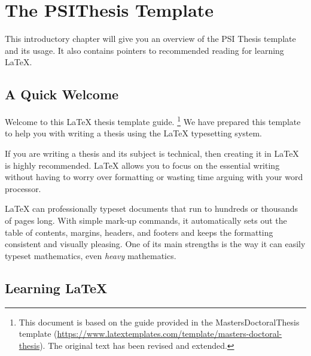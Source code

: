 
\chapter{The PSIThesis Template} %

\label{Chapter1} %


\newcommand{\keyword}[1]{\textbf{#1}}
\newcommand{\tabhead}[1]{\textbf{#1}}
\newcommand{\code}[1]{\texttt{#1}}
\newcommand{\file}[1]{\texttt{#1}}
\newcommand{\option}[1]{\texttt{\itshape#1}}


This introductory chapter will give you an overview of the PSI Thesis template and its usage.
It also contains pointers to recommended reading for learning \LaTeX{}.

\section{A Quick Welcome}

Welcome to this LaTeX thesis template guide.%
\footnote{This document is based on the guide provided in the MastersDoctoralThesis template (\url{https://www.latextemplates.com/template/masters-doctoral-thesis}). The original text has been revised and extended.}
We have prepared this template to help you with writing a thesis using the LaTeX typesetting system.

If you are writing a thesis and its subject is technical, then creating it in LaTeX is highly recommended. LaTeX allows you to focus on the essential writing without having to worry over formatting or wasting time arguing with your word processor.

LaTeX can professionally typeset documents that run to hundreds or thousands of pages long. With simple mark-up commands, it automatically sets out the table of contents, margins, headers, and footers and keeps the formatting consistent and visually pleasing. One of its main strengths is the way it can easily typeset mathematics, even \emph{heavy} mathematics.


\section{Learning LaTeX}

